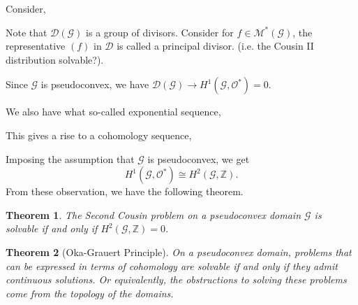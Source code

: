 \documentclass{article}
\newtheorem{theorem}{Theorem} [section]
\newcommand{\Z}[0]{\mathbb{Z}}
\newcommand{\G}[0]{\mathcal{G}}
\newcommand{\Ouv}[0]{\mathcal{O}}
\begin{document}
Consider,
\begin{center}
\end{center}
Note that $\mathcal{D}(\G)$ is a group of divisors. Consider for $f\in\mathcal{M}^*(\G)$, the representative $(f)$ in $\mathcal{D}$ is called a principal divisor. (i.e. the Cousin II distribution solvable?).
\begin{center}
\end{center}
Since $\G$ is pseudoconvex, we have $\mathcal{D}(\G)\to H^1(\G,\Ouv^*)=0$. 
\par We also have what so-called exponential sequence,
\begin{center}
\end{center}
This gives a rise to a cohomology sequence,
\begin{center}
\end{center}
Imposing the assumption that $\G$ is pseudoconvex, we get 
\begin{equation*}
  H^1(\G,\Ouv^*)\cong H^2(\G,\Z).
\end{equation*}
From these observation, we have the following theorem.
\begin{theorem}
  The Second Cousin problem on a pseudoconvex domain $\G$ is solvable if and only if $H^2(\G,\Z)=0$.
\end{theorem}
\begin{theorem}[Oka-Grauert Principle]
  On a pseudoconvex domain, problems that can be expressed in terms of cohomology are solvable if and only if they admit continuous solutions. Or equivalently, the obstructions to solving these problems come from the topology of the domains.
\end{theorem}
\end{document}
